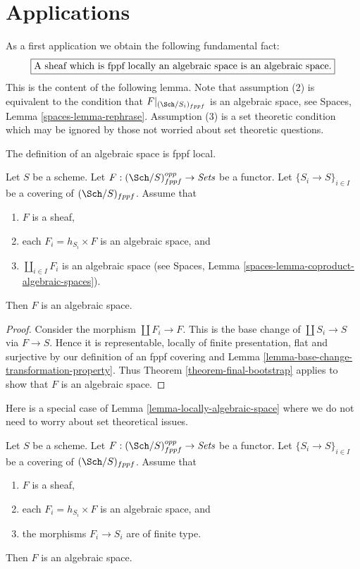 \section{Applications}
\label{section-applications}

\noindent
As a first application we obtain the following fundamental fact:
$$
\fbox{A sheaf which is fppf locally an algebraic space is an algebraic space.}
$$
This is the content of the following lemma.
Note that assumption (2) is equivalent to the condition that
$F|_{(\Sch/S_i)_{fppf}}$ is an algebraic space, see
Spaces, Lemma \ref{spaces-lemma-rephrase}.
Assumption (3) is a set theoretic condition which may be ignored
by those not worried about set theoretic questions.

\begin{lemma}
\label{lemma-locally-algebraic-space}
\begin{slogan}
The definition of an algebraic space is fppf local.
\end{slogan}
Let $S$ be a scheme.
Let $F : (\Sch/S)_{fppf}^{opp} \to \textit{Sets}$ be a functor.
Let $\{S_i \to S\}_{i \in I}$ be a covering of $(\Sch/S)_{fppf}$.
Assume that
\begin{enumerate}
\item $F$ is a sheaf,
\item each $F_i = h_{S_i} \times F$ is an algebraic space, and
\item $\coprod_{i \in I} F_i$ is an algebraic space (see
Spaces, Lemma \ref{spaces-lemma-coproduct-algebraic-spaces}).
\end{enumerate}
Then $F$ is an algebraic space.
\end{lemma}

\begin{proof}
Consider the morphism $\coprod F_i \to F$. This is the base change
of $\coprod S_i \to S$ via $F \to S$. Hence it is representable,
locally of finite presentation, flat and surjective by our definition
of an fppf covering and
Lemma \ref{lemma-base-change-transformation-property}.
Thus
Theorem \ref{theorem-final-bootstrap}
applies to show that $F$ is an algebraic space.
\end{proof}

\noindent
Here is a special case of Lemma \ref{lemma-locally-algebraic-space}
where we do not need to worry about set theoretical issues.

\begin{lemma}
\label{lemma-locally-algebraic-space-finite-type}
Let $S$ be a scheme.
Let $F : (\Sch/S)_{fppf}^{opp} \to \textit{Sets}$ be a functor.
Let $\{S_i \to S\}_{i \in I}$ be a covering of $(\Sch/S)_{fppf}$.
Assume that
\begin{enumerate}
\item $F$ is a sheaf,
\item each $F_i = h_{S_i} \times F$ is an algebraic space, and
\item the morphisms $F_i \to S_i$ are of finite type.
\end{enumerate}
Then $F$ is an algebraic space.
\end{lemma}


